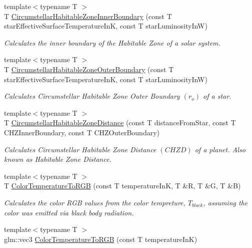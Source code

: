 \begin{DoxyCompactItemize}
{\footnotesize template$<$typename T $>$ }\\T \mbox{\hyperlink{group___e_g_x_phys-_circumstellar_habitable_zone_limit_gab31a33d0dbd3ecd00537832b5b836d73}{Circumstellar\+Habitable\+Zone\+Inner\+Boundary}} (const T star\+Effective\+Surface\+Temperature\+InK, const T star\+Luminosity\+InW)
\begin{DoxyCompactList}\small\item\em Calculates the inner boundary of the Habitable Zone of a solar system. \end{DoxyCompactList}\item 
{\footnotesize template$<$typename T $>$ }\\T \mbox{\hyperlink{group___e_g_x_phys-_circumstellar_habitable_zone_limit_ga3a6dbbdaddddd071cb1f0a20e40d83bd}{Circumstellar\+Habitable\+Zone\+Outer\+Boundary}} (const T star\+Effective\+Surface\+Temperature\+InK, const T star\+Luminosity\+InW)
\begin{DoxyCompactList}\small\item\em Calculates Circumstellar Habitable Zone Outer Boundary $(r_o)$ of a star. \end{DoxyCompactList}\item 
{\footnotesize template$<$typename T $>$ }\\T \mbox{\hyperlink{group___e_g_x_phys-_circumstellar_habitable_zone_limit_gaf289fb8f037ece66d850f7d827f83752}{Circumstellar\+Habitable\+Zone\+Distance}} (const T distance\+From\+Star, const T C\+H\+Z\+Inner\+Boundary, const T C\+H\+Z\+Outer\+Boundary)
\begin{DoxyCompactList}\small\item\em Calculates Circumstellar Habitable Zone Distance $(CHZD)$ of a planet. Also known as Habitable Zone Distance. \end{DoxyCompactList}\item 
{\footnotesize template$<$typename T $>$ }\\T \mbox{\hyperlink{group___e_g_x_phys-_astrophysics-_color_temperature_ga81db6b5b397c9f788001be73adae032d}{Color\+Temperature\+To\+R\+GB}} (const T temperature\+InK, T \&R, T \&G, T \&B)
\begin{DoxyCompactList}\small\item\em Calculates the color R\+GB values from the color tempreture, $T_{black}$, assuming the color was emitted via black body radiation. \end{DoxyCompactList}\item 
{\footnotesize template$<$typename T $>$ }\\glm\+::vec3 \mbox{\hyperlink{group___e_g_x_phys-_astrophysics-_color_temperature_gaad787485a232976da96c2c785ce21dad}{Color\+Temperature\+To\+R\+GB}} (const T temperature\+InK)

\end{DoxyCompactItemize}
